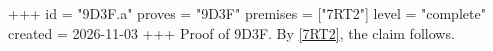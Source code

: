 +++
id = "9D3F.a"
proves = "9D3F"
premises = ["7RT2"]
level = "complete"
created = 2026-11-03
+++
Proof of 9D3F. By \ref{7RT2}, the claim follows.

